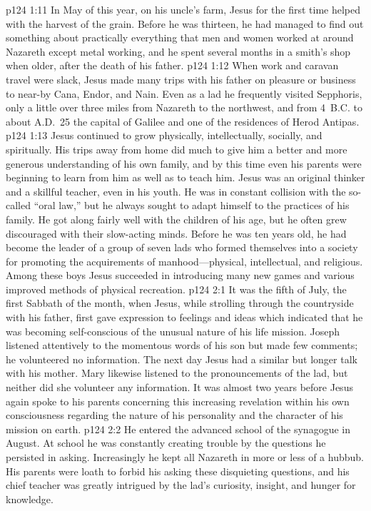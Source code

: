 \pc \vs p124 1:11 In May of this year, on his uncle’s farm, Jesus for the first time helped with the harvest of the grain. Before he was thirteen, he had managed to find out something about practically everything that men and women worked at around Nazareth except metal working, and he spent several months in a smith’s shop when older, after the death of his father.
\vs p124 1:12 When work and caravan travel were slack, Jesus made many trips with his father on pleasure or business to near\hyp{}by Cana, Endor, and Nain. Even as a lad he frequently visited Sepphoris, only a little over three miles from Nazareth to the northwest, and from 4~B.C. to about A.D.~25 the capital of Galilee and one of the residences of Herod Antipas.
\vs p124 1:13 Jesus continued to grow physically, intellectually, socially, and spiritually. His trips away from home did much to give him a better and more generous understanding of his own family, and by this time even his parents were beginning to learn from him as well as to teach him. Jesus was an original thinker and a skillful teacher, even in his youth. He was in constant collision with the so\hyp{}called “oral law,” but he always sought to adapt himself to the practices of his family. He got along fairly well with the children of his age, but he often grew discouraged with their slow\hyp{}acting minds. Before he was ten years old, he had become the leader of a group of seven lads who formed themselves into a society for promoting the acquirements of manhood---physical, intellectual, and religious. Among these boys Jesus succeeded in introducing many new games and various improved methods of physical recreation.
\vs p124 2:1 It was the fifth of July, the first Sabbath of the month, when Jesus, while strolling through the countryside with his father, first gave expression to feelings and ideas which indicated that he was becoming self\hyp{}conscious of the unusual nature of his life mission. Joseph listened attentively to the momentous words of his son but made few comments; he volunteered no information. The next day Jesus had a similar but longer talk with his mother. Mary likewise listened to the pronouncements of the lad, but neither did she volunteer any information. It was almost two years before Jesus again spoke to his parents concerning this increasing revelation within his own consciousness regarding the nature of his personality and the character of his mission on earth.
\pc \vs p124 2:2 He entered the advanced school of the synagogue in August. At school he was constantly creating trouble by the questions he persisted in asking. Increasingly he kept all Nazareth in more or less of a hubbub. His parents were loath to forbid his asking these disquieting questions, and his chief teacher was greatly intrigued by the lad’s curiosity, insight, and hunger for knowledge.

